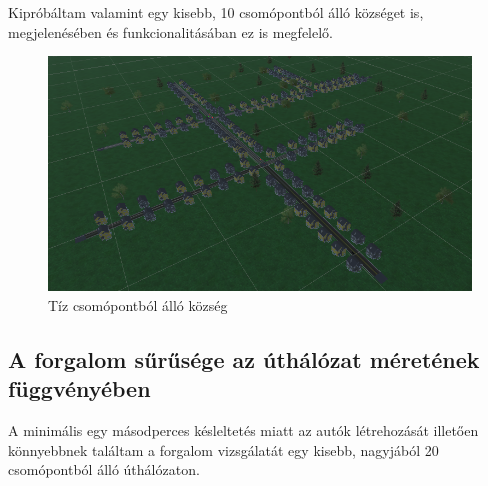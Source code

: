 Kipróbáltam valamint egy kisebb, 10 csomópontból álló községet is, megjelenésében és funkcionalitásában ez is megfelelő.
\begin{figure}[H]
\includegraphics[width=\linewidth]{village.png}
\caption{Tíz csomópontból álló község}
\label{fig:smalltown}
\end{figure}

\subsection{A forgalom sűrűsége az úthálózat méretének függvényében}
A minimális egy másodperces késleltetés miatt az autók létrehozását illetően könnyebbnek találtam a forgalom vizsgálatát egy kisebb, nagyjából 20 csomópontból álló úthálózaton.

